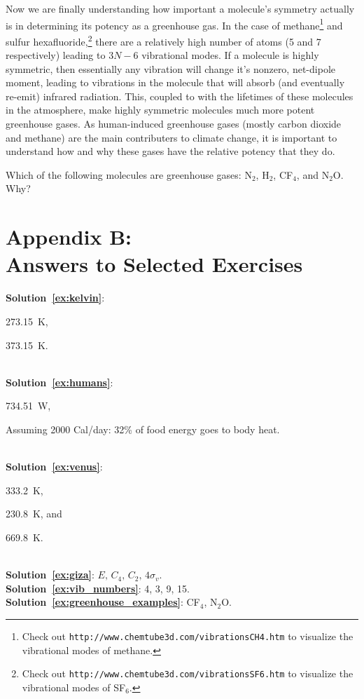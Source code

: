   
    Now we are finally understanding how important a molecule's symmetry actually is in determining its potency as a greenhouse gas. In the case of methane\footnote{Check out \texttt{http://www.chemtube3d.com/vibrationsCH4.htm} to visualize the vibrational modes of methane.} and sulfur hexafluoride,\footnote{Check out \texttt{http://www.chemtube3d.com/vibrationsSF6.htm} to visualize the vibrational modes of SF$_6$.} there are a relatively high number of atoms (5 and 7 respectively) leading to $3N - 6$ vibrational modes. If a molecule is highly symmetric, then essentially any vibration will change it's nonzero, net-dipole moment, leading to vibrations in the molecule that will absorb (and eventually re-emit) infrared radiation. This, coupled to with the lifetimes of these molecules in the atmosphere, make highly symmetric molecules much more potent greenhouse gases. As human-induced greenhouse gases (mostly carbon dioxide and methane) are the main contributers to climate change, it is important to understand how and why these gases have the relative potency that they do.

    \begin{exercise}
        Which of the following molecules are greenhouse gases: N$_2$, H$_2$, CF$_4$, and N$_2$O. Why?
        \label{ex:greenhouse_examples}
    \end{exercise}



\newpage
\section*{\label{app:answers}{\LARGE{Appendix B:}}\\Answers to Selected Exercises}
    \textbf{Solution~\ref{ex:kelvin}}: \begin{enumerate*}[(a)]
        \item \SI{273.15}{\kelvin}, 
        \item \SI{373.15}{\kelvin}.
    \end{enumerate*} \\
    \textbf{Solution~\ref{ex:humans}}: \begin{enumerate*}[(a)]
        \item \SI{734.51}{\watt}, 
        \item Assuming 2000 Cal/day: 32\% of food energy goes to body heat.
    \end{enumerate*}
    \\
    \textbf{Solution~\ref{ex:venus}}: \begin{enumerate*}[(a)]
        \item \SI{333.2}{\kelvin}, 
        \item \SI{230.8}{\kelvin}, and
        \item \SI{669.8}{\kelvin}.
    \end{enumerate*}   
    \\
    \textbf{Solution~\ref{ex:giza}}: $E,\, C_4,\, C_2,\, 4 \sigma_v.$ \\
    \textbf{Solution~\ref{ex:vib_numbers}}: 4, 3, 9, 15.  \\
    \textbf{Solution~\ref{ex:greenhouse_examples}}: CF$_4$, N$_2$O.